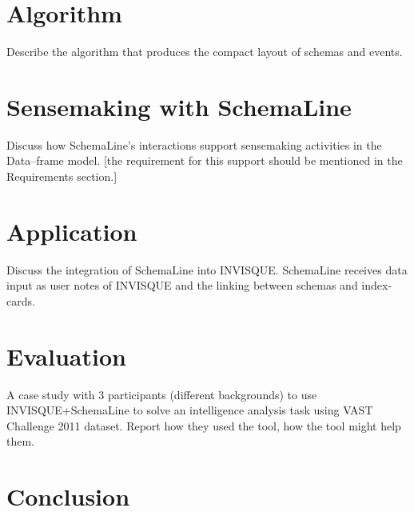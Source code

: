 \section{Algorithm}

Describe the algorithm that produces the compact layout of schemas and events.


\section{Sensemaking with SchemaLine}
Discuss how SchemaLine's interactions support sensemaking activities in the Data--frame model. [the requirement for this support should be mentioned in the Requirements section.]

\section{Application}
Discuss the integration of SchemaLine into INVISQUE. SchemaLine receives data input as user notes of INVISQUE and the linking between schemas and index-cards.

\section{Evaluation}
A case study with 3 participants (different backgrounds) to use INVISQUE+SchemaLine to solve an intelligence analysis task using VAST Challenge 2011 dataset. Report how they used the tool, how the tool might help them.

\section{Conclusion}
%
%
%
%
%
%
%